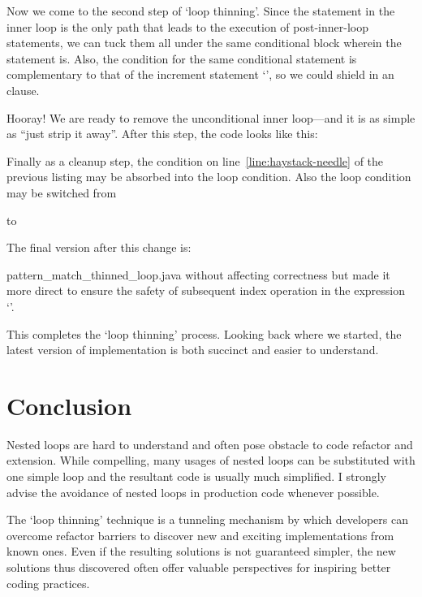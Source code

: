 Now we come to the second step of `loop thinning'.
Since the  statement in the inner loop is the only path that leads to the
execution of post-inner-loop statements, we can tuck them all under the same
conditional block wherein the  statement is.
Also, the condition for the same conditional statement is complementary to that of the
increment statement `', so we could shield  in an  clause.


Hooray!
We are ready to remove the unconditional inner loop---and it is as simple as ``just strip it away''.
After this step, the code looks like this:

Finally as a cleanup step, the condition on line~\ref{line:haystack-needle} of the previous listing
may be absorbed into the loop condition.
Also the loop condition may be switched from
\begin{quote}
\end{quote}
to
\begin{quote}
\end{quote}
The final version after this change is:

{pattern_match_thinned_loop.java}
without affecting correctness but made it more direct to ensure the safety of subsequent index
operation in the expression `'.

This completes the `loop thinning' process.
Looking back where we started, the latest version of implementation is both succinct and easier to
understand.


\section{Conclusion}\label{sec:loop-push-up-conclusion}



Nested loops are hard to understand and often pose obstacle to code refactor and extension.
While compelling, many usages of nested loops can be
substituted with one simple loop and the resultant code is usually much simplified.
I strongly advise the avoidance of nested loops in production code whenever possible.


The `loop thinning' technique is a tunneling mechanism by which developers can overcome
refactor barriers to discover new and exciting implementations from known ones.
Even if the resulting solutions is not guaranteed simpler, the new solutions thus discovered often
offer valuable perspectives for inspiring better coding practices.
